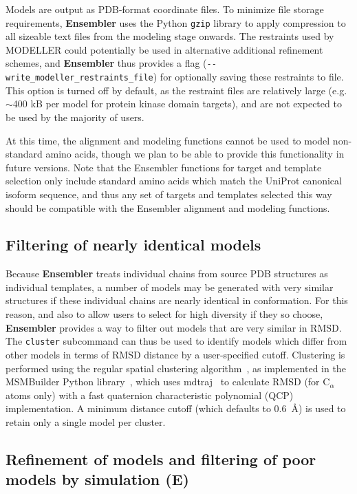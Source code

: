 \documentclass[10pt,letterpaper]{article}
\begin{document}
Models are output as PDB-format coordinate files.
To minimize file storage requirements, {\bf Ensembler} uses the Python {\tt gzip} library to apply compression to all sizeable text files from the modeling stage onwards.
The restraints used by MODELLER could potentially be used in alternative additional refinement schemes, and {\bf Ensembler} thus provides a flag ({\tt -{}-write\_modeller\_restraints\_file}) for optionally saving these restraints to file.
This option is turned off by default, as the restraint files are relatively large (e.g.~$\sim$400 kB per model for protein kinase domain targets), and are not expected to be used by the majority of users.

At this time, the alignment and modeling functions cannot be used to model non-standard amino acids, though we plan to be able to provide this functionality in future versions.
Note that the Ensembler functions for target and template selection only include standard amino acids which match the UniProt canonical isoform sequence, and thus any set of targets and templates selected this way should be compatible with the Ensembler alignment and modeling functions.

\subsection*{Filtering of nearly identical models}

Because {\bf Ensembler} treats individual chains from source PDB structures as individual templates, a number of models may be generated with very similar structures if these individual chains are nearly identical in conformation.
For this reason, and also to allow users to select for high diversity if they so choose, {\bf Ensembler} provides a way to filter out models that are very similar in RMSD.
The {\tt cluster} subcommand can thus be used to identify models which differ from other models in terms of RMSD distance by a user-specified cutoff.
Clustering is performed using the regular spatial clustering algorithm~\cite{noe:jcp:2011:msm-review}, as implemented in the MSMBuilder Python library~\cite{msmbuilder}, which uses mdtraj~\cite{mdtraj} to calculate RMSD (for C$_\alpha$ atoms only) with a fast quaternion characteristic polynomial (QCP)~\cite{theobald:acta-cryst-a:2005:qcp,theobald:j-comput-chem:2010:qcp,theobald:j-comput-chem:2011:qcp} implementation.
A minimum distance cutoff (which defaults to 0.6~\AA) is used to retain only a single model per cluster.

\subsection*{Refinement of models and filtering of poor models by simulation (E)}
\end{document}
